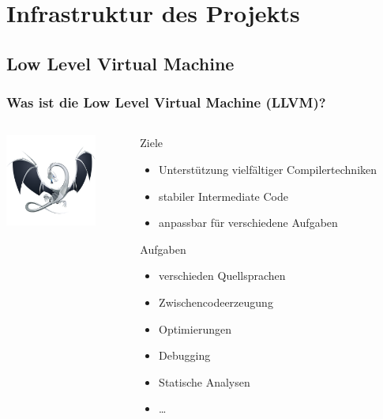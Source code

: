 \documentclass[ucs,9pt]{beamer}
\begin{document}
\section{Infrastruktur des Projekts}
\subsection{Low Level Virtual Machine}
\begin{frame}
  \frametitle{Was ist die Low Level Virtual Machine (LLVM)?}
  \begin{columns}
    \begin{column}{0.3\textwidth}
      \begin{center}
        \includegraphics[width=3cm]{llvm_logo}
      \end{center}
    \end{column}
    \begin{column}{0.7\textwidth}
      \begin{block}{Ziele}
        \begin{itemize}
          \item Unterstützung vielfältiger Compilertechniken
          \item stabiler Intermediate Code
          \item anpassbar für verschiedene Aufgaben
        \end{itemize}
      \end{block}
      \begin{block}{Aufgaben}
        \begin{itemize}
          \item verschieden Quellsprachen
          \item Zwischencodeerzeugung
          \item Optimierungen
          \item Debugging
          \item Statische Analysen
          \item \dots
        \end{itemize}
      \end{block}
    \end{column}
  \end{columns}
\end{frame}
\end{document}
